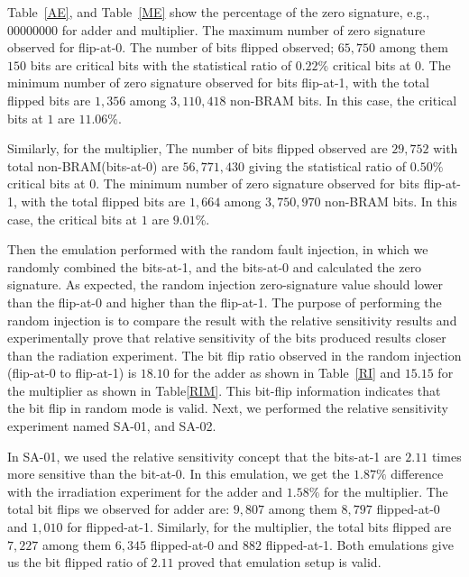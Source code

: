 Table~\ref{AE}, and Table~\ref{ME} show the percentage of the zero signature, e.g., $00000000$ for adder and multiplier. The maximum number of zero signature observed for flip-at-0. The number of bits flipped observed; $65,750$ among them $150$ bits are critical bits with the statistical ratio of $0.22\%$ critical bits at $0$. The minimum number of zero signature observed for bits flip-at-1, with the total flipped bits are $1,356$ among $3,110,418$ non-BRAM bits. In this case, the critical bits at $1$ are $11.06\%$. 

Similarly, for the multiplier,  The number of bits flipped observed are $29,752$ with total non-BRAM(bits-at-0) are $56,771,430$ giving the statistical ratio of $0.50\%$ critical bits at $0$. The minimum number of zero signature observed for bits flip-at-1, with the total flipped bits are $1,664$ among $3,750,970$ non-BRAM bits. In this case, the critical bits at $1$ are $9.01\%$.


Then the emulation performed with the random fault injection, in which we randomly combined the bits-at-1, and the bits-at-0 and calculated the zero signature. As expected, the random injection zero-signature value should lower than the flip-at-0 and higher than the flip-at-1. The purpose of performing the random injection is to compare the result with the relative sensitivity results and experimentally prove that relative sensitivity of the bits produced results closer than the radiation experiment. The bit flip ratio observed in the random injection (flip-at-0 to flip-at-1) is $18.10$ for the adder as shown in Table~\ref{RI} and $15.15$ for the multiplier as shown in Table\ref{RIM}. This bit-flip information indicates that the bit flip in random mode is valid. Next, we performed the relative sensitivity experiment named SA-01, and SA-02.

In SA-01, we used the relative sensitivity concept that the  bits-at-1 are $2.11$ times more sensitive than the bit-at-0. In this emulation, we get the $1.87\%$ difference with the irradiation experiment for the adder and $1.58\%$ for the multiplier. The total bit flips we observed for adder are: $9,807$ among them $8,797$ flipped-at-0 and $1,010$ for flipped-at-1. Similarly, for the multiplier, the total bits flipped are $7,227$ among them $6,345$ flipped-at-0 and $882$ flipped-at-1. Both emulations give us the bit flipped ratio of $2.11$ proved that emulation setup is valid.

